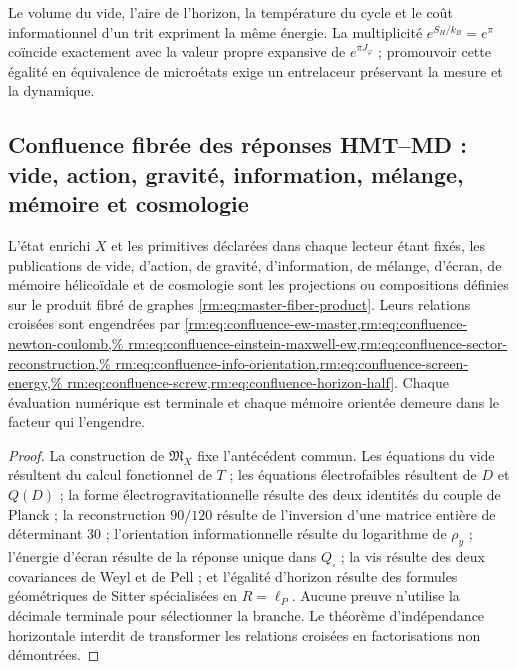 Le volume du vide, l’aire de l’horizon, la température du cycle et le coût informationnel d’un trit expriment la même énergie. La multiplicité \(e^{S_H/k_B}=e^\pi\) coïncide exactement avec la valeur propre expansive de \(e^{\pi J_\varphi}\) ; promouvoir cette égalité en équivalence de microétats exige un entrelaceur préservant la mesure et la dynamique.

\subsection{Confluence fibrée des réponses HMT–MD : vide, action, gravité, information, mélange, mémoire et cosmologie}

\begin{theorem}
L’état enrichi \(X\) et les primitives déclarées dans chaque lecteur étant fixés, les publications de vide, d’action, de gravité, d’information, de mélange, d’écran, de mémoire hélicoïdale et de cosmologie sont les projections ou compositions définies sur le produit fibré de graphes \cref{rm:eq:master-fiber-product}. Leurs relations croisées sont engendrées par \cref{rm:eq:confluence-ew-master,rm:eq:confluence-newton-coulomb,%
rm:eq:confluence-einstein-maxwell-ew,rm:eq:confluence-sector-reconstruction,%
rm:eq:confluence-info-orientation,rm:eq:confluence-screen-energy,%
rm:eq:confluence-screw,rm:eq:confluence-horizon-half}.
Chaque évaluation numérique est terminale et chaque mémoire orientée demeure dans le facteur qui l’engendre.
\end{theorem}

\begin{proof}
La construction de \(\mathfrak M_X\) fixe l’antécédent commun. Les équations du vide résultent du calcul fonctionnel de \(T\) ; les équations électrofaibles résultent de \(D\) et \(Q(D)\) ; la forme électrogravitationnelle résulte des deux identités du couple de Planck ; la reconstruction \(90/120\) résulte de l’inversion d’une matrice entière de déterminant \(30\) ; l’orientation informationnelle résulte du logarithme de \(\rho_y\) ; l’énergie d’écran résulte de la réponse unique dans \(Q_{\square}\) ; la vis résulte des deux covariances de Weyl et de Pell ; et l’égalité d’horizon résulte des formules géométriques de Sitter spécialisées en \(R=\ell_P\). Aucune preuve n’utilise la décimale terminale pour sélectionner la branche. Le théorème d’indépendance horizontale interdit de transformer les relations croisées en factorisations non démontrées.
\end{proof}


